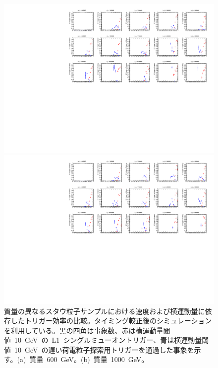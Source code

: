 \begin{figure}[tbp]
    \begin{minipage}{0.49\hsize}
    \centering   
    \includegraphics[width=\textwidth,page=15]{img/rec/stau_600.pdf}
    \subcaption{}
    \end{minipage}
    \begin{minipage}{0.49\hsize}
    \centering   
    \includegraphics[width=\textwidth,page=15]{img/rec/stau_1000.pdf}
    \subcaption{}
    \end{minipage}
    \caption[質量の異なるスタウ粒子サンプルにおける速度および横運動量に依存したトリガー効率の比較]{質量の異なるスタウ粒子サンプルにおける速度および横運動量に依存したトリガー効率の比較。タイミング較正後のシミュレーションを利用している。黒の四角は事象数、赤は横運動量閾値~10~GeV~の~L1~シングルミューオントリガー、青は横運動量閾値~10~GeV~の遅い荷電粒子探索用トリガーを通過した事象を示す。(a)~質量~600~GeV。(b)~質量~1000~GeV。}\label{fig:triptbeta6}
\end{figure}
